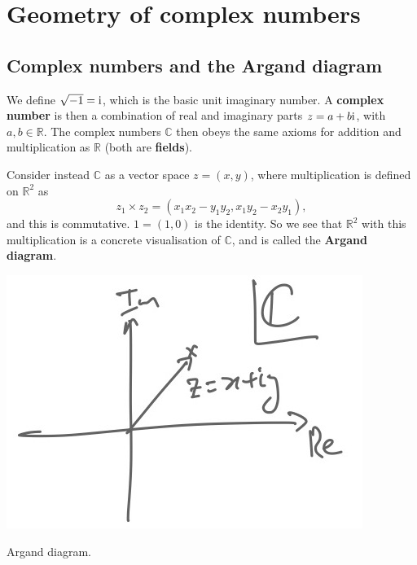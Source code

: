 \documentclass[letter-paper]{tufte-book}
\newcommand{\zi}{{\rm i}}
\newcommand\Def[1]{\textbf{#1}}
\begin{document}

\chapter{Geometry of complex numbers}


\section{Complex numbers and the Argand diagram}

We define $\sqrt{-1}=\zi$, which is the basic unit imaginary number. A
\Def{complex number} is then a combination of real and imaginary parts
$z=a+b\zi$, with $a,b\in\mathbb{R}$. The complex numbers $\mathbb{C}$ then obeys
the same axioms for addition and multiplication as $\mathbb{R}$ (both are
\Def{fields}).

Consider instead $\mathbb{C}$ as a vector space $z=(x,y)$, where multiplication
is defined on $\mathbb{R}^2$ as
\begin{equation*}
	z_1\times z_2 = (x_1 x_2 - y_1 y_2, x_1 y_2 - x_2 y_1),
\end{equation*}
and this is commutative. $1=(1,0)$ is the identity. So we see that
$\mathbb{R}^2$ with this multiplication is a concrete visualisation of
$\mathbb{C}$, and is called the \Def{Argand diagram}.

\begin{marginfigure}
  \includegraphics{figs/comp_argand}
  \caption{Argand diagram.}
\end{marginfigure}
\end{document}
